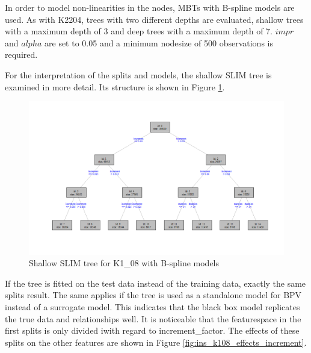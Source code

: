 In order to model non-linearities in the nodes, MBTs with B-spline models are used. As with K2204, trees with two different depths are evaluated, shallow trees with a maximum depth of 3 and deep trees with a maximum depth of 7. $impr$ and $alpha$ are set to 0.05 and a minimum nodesize of 500 observations is required.

For the interpretation of the splits and models, the shallow SLIM tree is examined in more detail. Its structure is shown in Figure \ref{fig:ins_k108_slim_bsplines_small_tree}.

\begin{figure}[!htb]
    \centering
    \includegraphics[width = 16cm]{Figures/insurance_use_case/k1_08_BPV/slim_bsplines_small_tree.png}
    \caption{Shallow SLIM tree for K1\_08 with B-spline models}
    \label{fig:ins_k108_slim_bsplines_small_tree}
\end{figure}

If the tree is fitted on the test data instead of the training data, exactly the same splits result. The same applies if the tree is used as a standalone model for BPV instead of a surrogate model. This indicates that the black box model replicates the true data and relationships well.
It is noticeable that the featurespace in the first splits is only divided iwith regard to increment\_factor. The effects of these splits on the other features are shown in Figure \ref{fig:ins_k108_effects_increment}.


